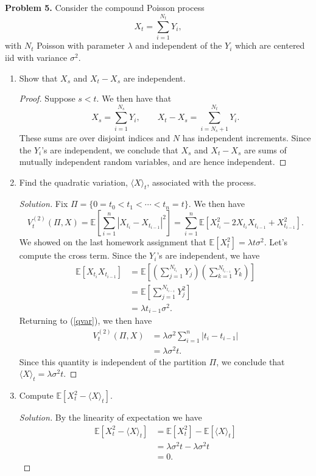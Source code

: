 \documentclass[11pt,letterpaper]{report}
\newcommand{\E}{\mathbb{E}}
\newenvironment{solution}
{\begin{proof}[Solution]}
{\end{proof}}
\begin{document}
\noindent\textbf{Problem 5. }
Consider the compound Poisson process
\[
X_t = \sum_{i=1}^{N_t}Y_i,
\]
with $N_t$ Poisson with parameter $\lambda$ and independent of the $Y_i$ which are centered iid with variance $\sigma^2$.
\begin{enumerate}[(a.)]
	\item Show that $X_s$ and $X_t-X_s$ are independent.
	\begin{proof}
		Suppose $s<t$. We then have that
		\[
		X_s = \sum_{i=1}^{N_s}Y_i,\qquad X_t-X_s = \sum_{i=N_s+1}^{N_t}Y_i.
		\]
		These sums are over disjoint indices and $N$ has independent increments. Since the $Y_i$'s are independent, we conclude that $X_s$ and $X_t-X_s$ are sums of mutually independent random variables, and are hence independent.
	\end{proof}

	\item Find the quadratic variation, $\langle X\rangle_t$, associated with the process.
	\begin{solution}
		Fix $\Pi = \{0 = t_0 < t_1 <\cdots < t_n = t\}$. We then have
		\begin{equation}\label{qvar}
			V_t^{(2)}(\Pi, X) = \E\left[\sum_{i=1}^n|X_{t_i}-X_{t_{i-1}}|^2\right] = \sum_{i=1}^n\E[X_{t_i}^2-2X_{t_i}X_{t_{i-1}}+X_{t_{i-1}}^2].
		\end{equation}
		We showed on the last homework assignment that $\E[X_t^2] = \lambda t\sigma^2$. Let's compute the cross term. Since the $Y_i$'s are independent, we have
		\begin{align*}
			\E[X_{t_i}X_{t_{i-1}}] &= \E\left[\left(\sum_{j=1}^{N_{t_i}}Y_j\right)\left(\sum_{k=1}^{N_{t_{i-1}}}Y_k\right)\right]\\
			&= \E\left[\sum_{j=1}^{N_{t_{i-1}}}Y_j^2\right]\\
			&= \lambda t_{i-1}\sigma^2.
		\end{align*}
		Returning to (\ref{qvar}), we then have
		\begin{align*}
		V_t^{(2)}(\Pi, X) &= \lambda\sigma^2 \sum_{i=1}^n|t_i-t_{i-1}|\\
		&= \lambda\sigma^2t.
		\end{align*}
		Since this quantity is independent of the partition $\Pi$, we conclude that $\langle X\rangle_t = \lambda\sigma^2t$.
	\end{solution}

	\item Compute $\E[X_t^2 - \langle X\rangle_t]$.
	\begin{solution}
		By the linearity of expectation we have
		\begin{align*}
			\E[X_t^2 - \langle X\rangle_t] &= \E[X_t^2] - \E[\langle X\rangle_t]\\
			&= \lambda\sigma^2t - \lambda\sigma^2t\\
			&= 0.
		\end{align*}
	\end{solution}
\end{enumerate}
\end{document}

